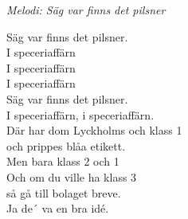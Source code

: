 {\footnotesize\textit{Melodi: Säg var finns det pilsner}}\par
\vspace{10pt}
Säg var finns det pilsner.\\
I speceriaffärn\\
I speceriaffärn\\
I speceriaffärn\\
Säg var finns det pilsner.\\
I speceriaffärn, i speceriaffärn.\\
Där har dom Lyckholms och klass 1\\
och prippes blåa etikett.\\
Men bara klass 2 och 1\\
Och om du ville ha klass 3\\
så gå till bolaget breve.\\
Ja de´ va en bra idé.
